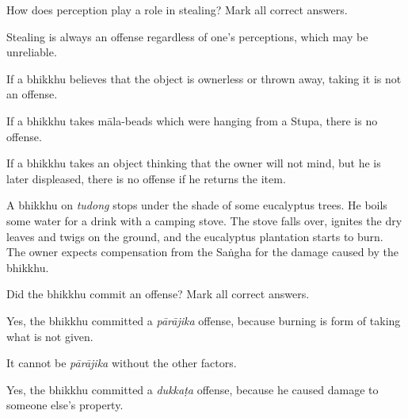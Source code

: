 \begin{exam}{\autoExamName}
\begin{problem}
\end{problem}

\problemDivide

\begin{problem}

  How does perception play a role in stealing? Mark all correct answers.

\bigskip

\begin{manswers}{1}
    \bChoices

     Stealing is always an offense regardless of one's perceptions, which may be unreliable. \eAns

     If a bhikkhu believes that the object is ownerless or thrown away, taking it is not an offense. \eAns

     If a bhikkhu takes māla-beads which were hanging from a Stupa, there is no offense. \eAns

     If a bhikkhu takes an object thinking that the owner will not mind, but he is later displeased, there is no offense if he returns the item. \eAns

    \eChoices
\end{manswers}

\end{problem}

\problemDivide

\begin{problem}

  A bhikkhu on \emph{tudong} stops under the shade of some eucalyptus trees.
  He boils some water for a drink with a camping stove.
  The stove falls over, ignites the dry leaves and twigs on the ground, and the eucalyptus plantation starts to burn.
  The owner expects compensation from the Saṅgha for the damage caused by the bhikkhu.

  Did the bhikkhu commit an offense? Mark all correct answers.

  \bigskip

  \begin{manswers}{1}
    \bChoices
     Yes, the bhikkhu committed a \emph{pārājika} offense, because burning is form of taking what is not given. \eAns

    \begin{solution}
      It cannot be \emph{pārājika} without the other factors.
    \end{solution}

     Yes, the bhikkhu committed a \emph{dukkaṭa} offense, because he caused damage to someone else's property. \eAns


\end{manswers}
\end{problem}
\end{exam}
